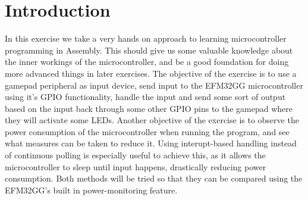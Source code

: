 \chapter{Introduction}
In this exercise we take a very hands on approach to learning microcontroller programming in Assembly. This should give us some valuable knowledge about the inner workings of the microcontroller, and be a good foundation for doing more advanced things in later exercises.
The objective of the exercise is to use a gamepad peripheral as input device, send input to the EFM32GG microcontroller using it's GPIO functionality, handle the input and send some sort of output based on the input back through some other GPIO pins to the gamepad where they will activate some LEDs.
Another objective of the exercise is to observe the power consumption of the microcontroller when running the program, and see what measures can be taken to reduce it. Using interupt-based handling instead of continuous polling is especially useful to achieve this, as it allows the microcontroller to sleep until input happens, drastically reducing power consumption. Both methods will be tried so that they can be compared using the EFM32GG's built in power-monitoring feature.
